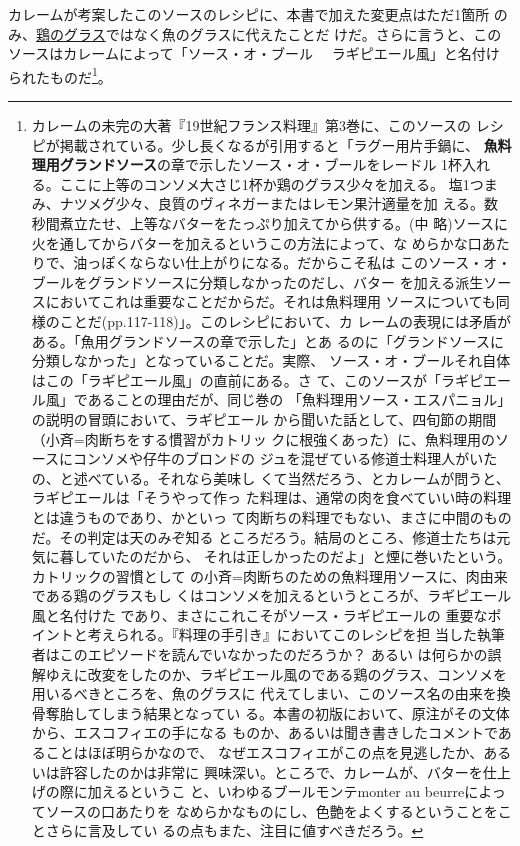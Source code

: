 \begin{recette}
カレームが考案したこのソースのレシピに、本書で加えた変更点はただ1箇所
のみ、\protect\hyperlink{glace-de-volaille}{鶏のグラス}ではなく魚のグラスに代えたことだ
けだ。さらに言うと、このソースはカレームによって「ソース・オ・ブール　
ラギピエール風」と名付けられたものだ\footnote{カレームの未完の大著『19世紀フランス料理』第3巻に、このソースの
  レシピが掲載されている。少し長くなるが引用すると「ラグー用片手鍋に、
  \textbf{魚料理用グランドソース}の章で示したソース・オ・ブールをレードル
  1杯入れる。ここに上等のコンソメ大さじ1杯か鶏のグラス少々を加える。
  塩1つまみ、ナツメグ少々、良質のヴィネガーまたはレモン果汁適量を加
  える。数秒間煮立たせ、上等なバターをたっぷり加えてから供する。(中
  略)ソースに火を通してからバターを加えるというこの方法によって、な
  めらかな口あたりで、油っぽくならない仕上がりになる。だからこそ私は
  このソース・オ・ブールをグランドソースに分類しなかったのだし、バター
  を加える派生ソースにおいてこれは重要なことだからだ。それは魚料理用
  ソースについても同様のことだ(pp.117-118)」。このレシピにおいて、カ
  レームの表現には矛盾がある。「魚用グランドソースの章で示した」とあ
  るのに「グランドソースに分類しなかった」となっていることだ。実際、
  ソース・オ・ブールそれ自体はこの「ラギピエール風」の直前にある。さ
  て、このソースが「ラギピエール風」であることの理由だが、同じ巻の
  「魚料理用ソース・エスパニョル」の説明の冒頭において、ラギピエール
  から聞いた話として、四旬節の期間（小斉=肉断ちをする慣習がカトリッ
  クに根強くあった）に、魚料理用のソースにコンソメや仔牛のブロンドの
  ジュを混ぜている修道士料理人がいたの、と述べている。それなら美味し
  くて当然だろう、とカレームが問うと、ラギピエールは「そうやって作っ
  た料理は、通常の肉を食べていい時の料理とは違うものであり、かといっ
  て肉断ちの料理でもない、まさに中間のものだ。その判定は天のみぞ知る
  ところだろう。結局のところ、修道士たちは元気に暮していたのだから、
  それは正しかったのだよ」と煙に巻いたという。カトリックの習慣として
  の小斉=肉断ちのための魚料理用ソースに、肉由来である鶏のグラスもし
  くはコンソメを加えるというところが、ラギピエール風と名付けた
  であり、まさにこれこそがソース・ラギピエールの
  重要なポイントと考えられる。『料理の手引き』においてこのレシピを担
  当した執筆者はこのエピソードを読んでいなかったのだろうか？ あるい
  は何らかの誤解ゆえに改変をしたのか、ラギピエール風のである鶏のグラス、コンソメを用いるべきところを、魚のグラスに
  代えてしまい、このソース名の由来を換骨奪胎してしまう結果となってい
  る。本書の初版において、原注がその文体から、エスコフィエの手になる
  ものか、あるいは聞き書きしたコメントであることはほぼ明らかなので、
  なぜエスコフィエがこの点を見逃したか、あるいは許容したのかは非常に
  興味深い。ところで、カレームが、バターを仕上げの際に加えるというこ
  と、いわゆるブールモンテmonter au beurreによってソースの口あたりを
  なめらかなものにし、色艶をよくするということをことさらに言及してい
  るの点もまた、注目に値すべきだろう。}。


\end{recette}
